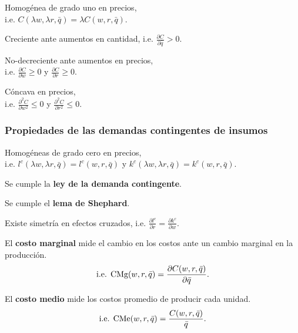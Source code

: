 \documentclass[8pt,a4paper]{extarticle}
\begin{document}
\begin{multicols}{3}
\begin{eqlist}
\item Homogénea de grado uno en precios, \\ i.e. $C(\lambda w, \lambda r, \bar{q}) = \lambda C(w, r, \bar{q}) $.
\item Creciente ante aumentos en cantidad, i.e. $\displaystyle \frac{\partial C}{\partial \bar{q}} > 0 $.
\item No-decreciente ante aumentos en precios, \\ i.e. $\displaystyle \frac{\partial C}{\partial w} \ge 0$ y $\displaystyle \frac{\partial C}{\partial r} \ge 0$.
\item Cóncava en precios, \\ i.e. $\displaystyle \frac{\partial^2 C}{\partial w^2} \le 0$ y $\displaystyle \frac{\partial^2 C}{\partial r^2} \le 0$.
\end{eqlist}

\subsubsection{Propiedades de las demandas contingentes de insumos}

\begin{eqlist}
\item Homogéneas de grado cero en precios, \\ i.e. $l^c (\lambda w, \lambda r, \bar{q}) = l^c (w, r, \bar{q})$ y $k^c (\lambda w, \lambda r, \bar{q}) = k^c (w, r, \bar{q})$.
\item Se cumple la \textbf{ley de la demanda contingente}.
\item Se cumple el \textbf{lema de Shephard}.
\item Existe simetría en efectos cruzados, i.e. $\displaystyle \frac{\partial l^c}{\partial r} = \frac{\partial k^c}{\partial w}$.
\end{eqlist}

\begin{boxdef}
	El \textbf{costo marginal} mide el cambio en los costos ante un cambio marginal en la producción.
	\[
		\text{\normalfont i.e. CMg} (w, r, \bar{q}) = \frac{\partial C (w, r, \bar{q})}{\partial \bar{q}}
	.\] 
\end{boxdef}

\begin{boxdef}
	El \textbf{costo medio} mide los costos promedio de producir cada unidad.
	\[
		\text{\normalfont i.e. CMe} (w, r, \bar{q}) = \frac{C(w, r, \bar{q})}{\bar{q}}
	.\] 
\end{boxdef}


\end{multicols}
\end{document}
